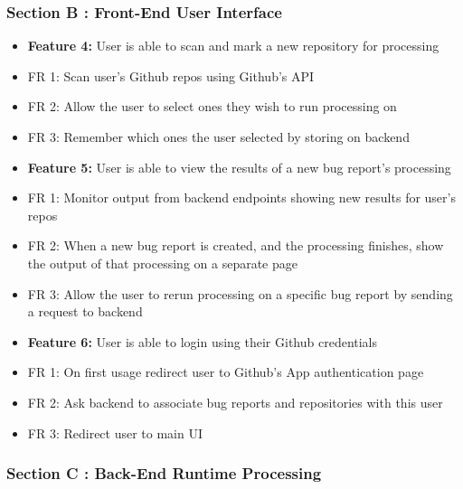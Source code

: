 \documentclass[12pt]{article}
\begin{document}
\subsubsection{Section B : Front-End User
Interface}\label{section-b-front-end-user-interface}

\begin{itemize}
\item
  \textbf{Feature 4:} User is able to scan and mark a new repository for
  processing
\item
  FR 1: Scan user's Github repos using Github's API
\item
  FR 2: Allow the user to select ones they wish to run processing on
\item
  FR 3: Remember which ones the user selected by storing on backend
\item
  \textbf{Feature 5:} User is able to view the results of a new bug
  report's processing
\item
  FR 1: Monitor output from backend endpoints showing new results for
  user's repos
\item
  FR 2: When a new bug report is created, and the processing finishes,
  show the output of that processing on a separate page
\item
  FR 3: Allow the user to rerun processing on a specific bug report by
  sending a request to backend
\item
  \textbf{Feature 6:} User is able to login using their Github
  credentials
\item
  FR 1: On first usage redirect user to Github's App authentication page
\item
  FR 2: Ask backend to associate bug reports and repositories with this
  user
\item
  FR 3: Redirect user to main UI
\end{itemize}

\subsubsection{Section C : Back-End Runtime
Processing}\label{section-c-back-end-runtime-processing}
\end{document}
